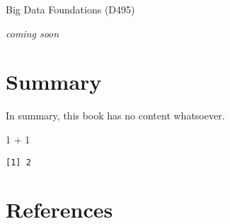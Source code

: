 \documentclass[
  letterpaper,
  DIV=11,
  numbers=noendperiod]{scrreprt}
\newenvironment{Shaded}{\begin{snugshade}}{\end{snugshade}}
\newcommand{\DecValTok}[1]{\textcolor[rgb]{0.68,0.00,0.00}{#1}}
\newcommand{\SpecialCharTok}[1]{\textcolor[rgb]{0.37,0.37,0.37}{#1}}
\begin{document}

Big Data Foundations (D495)

\emph{coming soon}


\chapter{Summary}\label{summary-3}

In summary, this book has no content whatsoever.

\begin{Shaded}
\begin{Highlighting}[]
\DecValTok{1} \SpecialCharTok{+} \DecValTok{1}
\end{Highlighting}
\end{Shaded}

\begin{verbatim}
[1] 2
\end{verbatim}


\chapter*{References}\label{references}


\label{refs}
\end{document}

